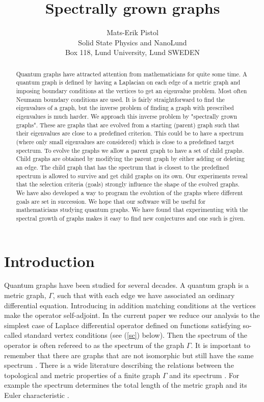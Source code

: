 \documentclass[a4paper]{article}
\title{Spectrally grown graphs}
\author{Mats-Erik Pistol\\ Solid State Physics and NanoLund\\ Box 118, Lund University, Lund SWEDEN}
\begin{document}
\maketitle

\begin{abstract}
Quantum graphs have attracted attention from mathematicians for quite some time. A quantum graph is defined by having a Laplacian on each edge of a metric graph and imposing boundary conditions at the vertices to get an eigenvalue problem. Most often Neumann boundary conditions are used. It is fairly straightforward to find the eigenvalues of a graph, but the inverse problem of finding a graph with prescribed eigenvalues is much harder. We approach this inverse problem by "spectrally grown graphs". These are graphs that are evolved from a starting (parent) graph such that their eigenvalues are close to a predefined criterion. This could be to have a spectrum (where only small eigenvalues are considered) which is close to a predefined target spectrum. To evolve the graphs we allow a parent graph to have a set of child graphs. Child graphs are obtained by modifying the parent graph by either adding or deleting an edge. The child graph that has the spectrum that is closest to the predefined spectrum is allowed to survive and get child graphs on its own. Our experiments reveal that the selection criteria (goals) strongly influence the shape of the evolved graphs. We have also developed a way to program the evolution of the graphs where different goals are set in succession.
We hope that our software will be useful for mathematicians studying quantum graphs. We have found that experimenting with the spectral growth of graphs makes it easy to find new conjectures and one such is given.

\end{abstract}

\section{Introduction}

Quantum graphs have been studied for several decades. A quantum graph \cite{kuchment2004quantum} is a metric graph, $\Gamma$, such that 
with each edge we have associated an ordinary differential equation. Introducing in addition matching conditions at the vertices make the operator self-adjoint.
In the current paper we reduce our analysis to the simplest case of Laplace differential operator defined on functions satisfying so-called standard vertex conditions (see (\ref{sc}) below).
Then the spectrum of the operator is often refereed to as the spectrum of the graph $ \Gamma. $ It is important to 
remember that  there are graphs that are not isomorphic but still have the same spectrum \cite{gutkin2001can}. 
There is a wide literature describing the relations between the topological and metric properties of a finite graph $ \Gamma $ and its spectrum \cite{kennedy2015spectral, berkolaiko2013introduction}.
For example the spectrum determines the total length of the metric graph and its Euler characteristic \cite{KurArkiv,KurJFA}.
\end{document}
